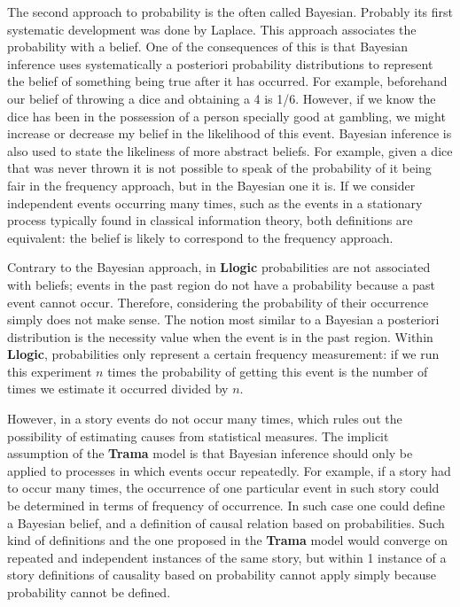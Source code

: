 \documentclass[
		twoside,openright,titlepage,numbers=noenddot,manychapters,
		headinclude,%
                footinclude=false,cleardoublepage=empty,
                BCOR=5mm,
		fontsize=11pt, %
                 enabledeprecatedfontcommands]{scrreprt}
\begin{document}
The second approach to probability is the often called Bayesian. Probably its first systematic development was done by Laplace. This approach associates the probability with a belief. One of the consequences of this is that Bayesian inference uses systematically a posteriori probability distributions to represent the belief of something being true after it has occurred.  For example, beforehand our belief of throwing a dice and obtaining a 4 is 1/6. However, if we know the dice has been in the possession of a person specially good at gambling,  we might increase or decrease my belief in the likelihood of this event.  Bayesian inference is also used to state the likeliness of more abstract beliefs. For example, given a dice that was never thrown it is not possible to speak of the probability of it being fair in the frequency approach, but in the Bayesian one it is. If we consider independent events occurring many times, such as the events in a stationary process typically found in classical information theory, both definitions are equivalent: the belief is likely to correspond to the frequency approach. 

Contrary to the Bayesian approach, in \textbf{Llogic} probabilities are not associated with beliefs; events in the past region do not have a probability because a past event cannot occur. Therefore, considering the probability of their occurrence simply does not make sense. The notion most similar to a Bayesian a posteriori distribution is the necessity value when the event is in the past region. Within \textbf{Llogic}, probabilities only represent a certain frequency measurement: if we run this experiment $n$ times the probability of getting this event is the number of times we estimate it occurred divided by $n$. %

However, in a story events do not occur many times, which rules out the possibility of estimating causes from statistical measures. The implicit assumption of the \textbf{Trama} model is that Bayesian inference should only be applied to processes in which events occur repeatedly. For example, if a story had to occur many times, the occurrence of one particular event in such story could be determined in terms of frequency of occurrence. In such case one could define a Bayesian belief, and a definition of causal relation based on probabilities.  Such kind of definitions and the one proposed in the \textbf{Trama} model would converge on repeated and independent instances of the same story, but within 1 instance of a story definitions of causality based on probability cannot apply simply because probability cannot be defined.
\end{document}
